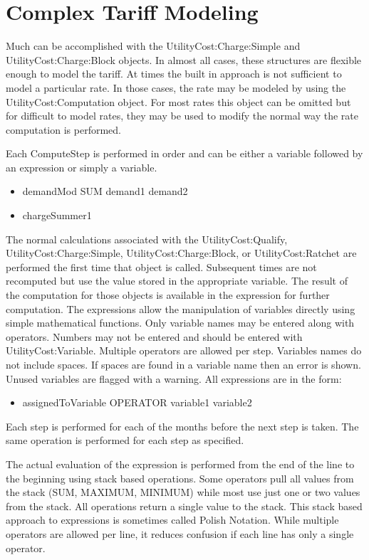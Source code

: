 \section{Complex Tariff Modeling}\label{complex-tariff-modeling}

Much can be accomplished with the UtilityCost:Charge:Simple and UtilityCost:Charge:Block objects. In almost all cases, these structures are flexible enough to model the tariff. At times the built in approach is not sufficient to model a particular rate. In those cases, the rate may be modeled by using the UtilityCost:Computation object. For most rates this object can be omitted but for difficult to model rates, they may be used to modify the normal way the rate computation is performed.

Each ComputeStep is performed in order and can be either a variable followed by an expression or simply a variable.

\begin{itemize}
\item
  demandMod SUM demand1 demand2
\item
  chargeSummer1
\end{itemize}

The normal calculations associated with the UtilityCost:Qualify, UtilityCost:Charge:Simple, UtilityCost:Charge:Block, or UtilityCost:Ratchet are performed the first time that object is called. Subsequent times are not recomputed but use the value stored in the appropriate variable. The result of the computation for those objects is available in the expression for further computation. The expressions allow the manipulation of variables directly using simple mathematical functions. Only variable names may be entered along with operators. Numbers may not be entered and should be entered with UtilityCost:Variable. Multiple operators are allowed per step. Variables names do not include spaces. If spaces are found in a variable name then an error is shown. Unused variables are flagged with a warning. All expressions are in the form:

\begin{itemize}
\tightlist
\item
  assignedToVariable OPERATOR variable1 variable2
\end{itemize}

Each step is performed for each of the months before the next step is taken. The same operation is performed for each step as specified.

The actual evaluation of the expression is performed from the end of the line to the beginning using stack based operations. Some operators pull all values from the stack (SUM, MAXIMUM, MINIMUM) while most use just one or two values from the stack. All operations return a single value to the stack. This stack based approach to expressions is sometimes called Polish Notation. While multiple operators are allowed per line, it reduces confusion if each line has only a single operator.

